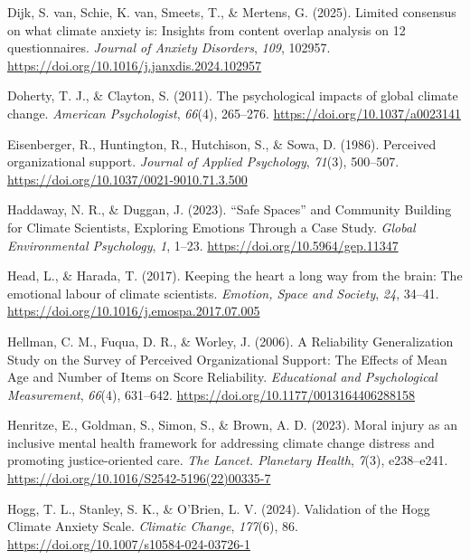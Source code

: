 \documentclass[
  man,
  longtable,
  nolmodern,
  notxfonts,
  notimes,
  colorlinks=true,linkcolor=blue,citecolor=blue,urlcolor=blue]{apa7}
\newlength{\cslhangindent}
\newenvironment{CSLReferences}[2] %
 {\begin{list}{}{%
  \setlength{\itemindent}{0pt}
  \setlength{\leftmargin}{0pt}
  \setlength{\parsep}{0pt}
  \ifodd #1
   \setlength{\leftmargin}{\cslhangindent}
   \setlength{\itemindent}{-1\cslhangindent}
  \fi
  \setlength{\itemsep}{#2\baselineskip}}}
 {\end{list}}
\begin{document}
\begin{CSLReferences}{1}{0}
Dijk, S. van, Schie, K. van, Smeets, T., \& Mertens, G. (2025). Limited
consensus on what climate anxiety is: {Insights} from content overlap
analysis on 12 questionnaires. \emph{Journal of Anxiety Disorders},
\emph{109}, 102957. \url{https://doi.org/10.1016/j.janxdis.2024.102957}

Doherty, T. J., \& Clayton, S. (2011). The psychological impacts of
global climate change. \emph{American Psychologist}, \emph{66}(4),
265--276. \url{https://doi.org/10.1037/a0023141}

Eisenberger, R., Huntington, R., Hutchison, S., \& Sowa, D. (1986).
Perceived organizational support. \emph{Journal of Applied Psychology},
\emph{71}(3), 500--507. \url{https://doi.org/10.1037/0021-9010.71.3.500}

Haddaway, N. R., \& Duggan, J. (2023). {``{Safe} {Spaces}''} and
{Community} {Building} for {Climate} {Scientists}, {Exploring}
{Emotions} {Through} a {Case} {Study}. \emph{Global Environmental
Psychology}, \emph{1}, 1--23. \url{https://doi.org/10.5964/gep.11347}

Head, L., \& Harada, T. (2017). Keeping the heart a long way from the
brain: {The} emotional labour of climate scientists. \emph{Emotion,
Space and Society}, \emph{24}, 34--41.
\url{https://doi.org/10.1016/j.emospa.2017.07.005}

Hellman, C. M., Fuqua, D. R., \& Worley, J. (2006). A {Reliability}
{Generalization} {Study} on the {Survey} of {Perceived} {Organizational}
{Support}: {The} {Effects} of {Mean} {Age} and {Number} of {Items} on
{Score} {Reliability}. \emph{Educational and Psychological Measurement},
\emph{66}(4), 631--642. \url{https://doi.org/10.1177/0013164406288158}

Henritze, E., Goldman, S., Simon, S., \& Brown, A. D. (2023). Moral
injury as an inclusive mental health framework for addressing climate
change distress and promoting justice-oriented care. \emph{The Lancet.
Planetary Health}, \emph{7}(3), e238--e241.
\url{https://doi.org/10.1016/S2542-5196(22)00335-7}

Hogg, T. L., Stanley, S. K., \& O'Brien, L. V. (2024). Validation of the
{Hogg} {Climate} {Anxiety} {Scale}. \emph{Climatic Change},
\emph{177}(6), 86. \url{https://doi.org/10.1007/s10584-024-03726-1}


\end{CSLReferences}
\end{document}
